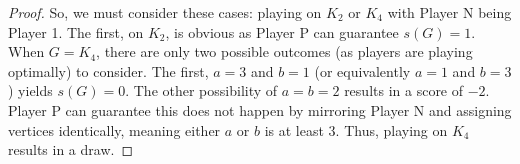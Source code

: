 \documentclass[10pt,a4paper]{amsart}
\begin{document}
\begin{proof}
    So, we must consider these cases: playing on $K_2$ or $K_4$ with Player N being Player 1. The first, on $K_2$, is obvious as Player P can guarantee $s(G)=1$. When $G = K_4$, there are only two possible outcomes (as players are playing optimally) to consider. The first, $a = 3$ and $b =1$ (or equivalently $a = 1$ and $b = 3$) yields $s(G) = 0$. The other possibility of $a = b = 2$ results in a score of $-2$. Player P can guarantee this does not happen by mirroring Player N and assigning vertices identically, meaning either $a$ or $b$ is at least $3$. Thus, playing on $K_4$ results in a draw.
\end{proof}
\end{document}
